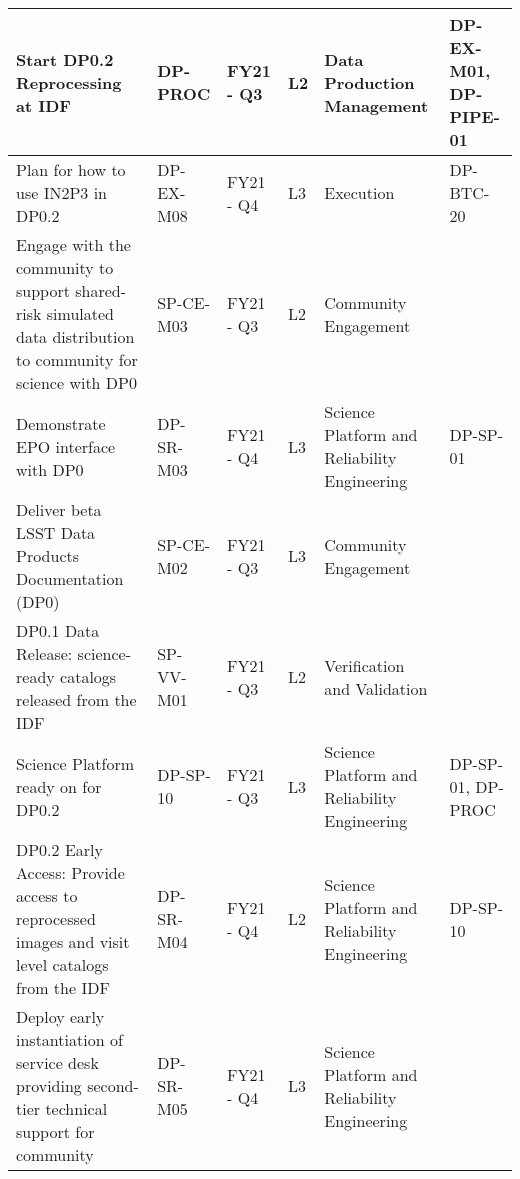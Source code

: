 \begin{longtable} {|p{}|l|l|l|l|p{}|}
{Start DP0.2 Reprocessing at IDF}&{DP-PROC}&{FY21 - Q3}&{L2}&{Data Production Management}&{DP-EX-M01, DP-PIPE-01} \\ \hline
{Plan for how to use IN2P3 in DP0.2}&{DP-EX-M08}&{FY21 - Q4}&{L3}&{Execution}&{DP-BTC-20} \\ \hline
{Engage with the community to support shared-risk simulated data distribution to community for science with DP0}&{SP-CE-M03}&{FY21 - Q3}&{L2}&{Community Engagement}& \\ \hline
{Demonstrate EPO interface with DP0}&{DP-SR-M03}&{FY21 - Q4}&{L3}&{Science Platform and Reliability Engineering}&{DP-SP-01} \\ \hline
{Deliver beta LSST Data Products Documentation (DP0)}&{SP-CE-M02}&{FY21 - Q3}&{L3}&{Community Engagement}& \\ \hline
{DP0.1 Data Release: science-ready catalogs released from the IDF}&{SP-VV-M01}&{FY21 - Q3}&{L2}&{Verification and Validation}& \\ \hline
{Science Platform ready on for DP0.2}&{DP-SP-10}&{FY21 - Q3}&{L3}&{Science Platform and Reliability Engineering}&{DP-SP-01, DP-PROC} \\ \hline
{DP0.2 Early Access: Provide access to reprocessed images and visit level catalogs from the IDF}&{DP-SR-M04}&{FY21 - Q4}&{L2}&{Science Platform and Reliability Engineering}&{DP-SP-10} \\ \hline
{Deploy early instantiation of service desk providing second-tier technical support for community}&{DP-SR-M05}&{FY21 - Q4}&{L3}&{Science Platform and Reliability Engineering}& \\ \hline
\end{longtable} \normalsize
